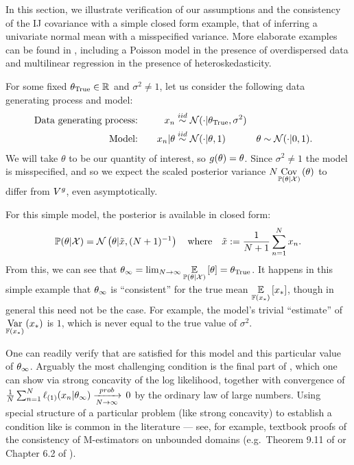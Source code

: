 \def\thetagen{\theta_{\mathrm{True}}}
\def\xbar{\tilde{\x}}

In this section, we illustrate verification of our assumptions and the
consistency of the IJ covariance with a simple closed form example, that of
inferring a univariate normal mean with a misspecified variance. More elaborate
examples can be found in , including a Poisson
model in the presence of overdispersed data and multilinear regression in the
presence of heteroskedasticity.

For some fixed $\thetagen \in \rdom{}$ and $\sigma^2 \ne 1$, let us
consider the following data generating process and model:
%
\begin{align*}
%
\textrm{Data generating process:}\quad&&
x_n &\iid \normdist(\cdot | \thetagen, \sigma^2) \\
\textrm{Model:}\quad&&
x_n \vert \theta &\iid \normdist(\cdot | \theta, 1) &
\theta &\sim \normdist(\cdot | 0, 1).
%
\end{align*}
%
We will take $\theta$ to be our quantity of interest, so $g(\theta) = \theta$.
Since $\sigma^2 \ne 1$ the model is misspecified, and so we expect the scaled posterior
variance $N \underset{\mathbb{P}(\theta | {\mathcal{X}})}{\mathrm{Cov}}\left(\theta\right)$ to differ from $V^g$, even asymptotically.

For this simple model, the posterior is available in closed form:
%
\begin{align*}
    \post = \normdist\left( \theta \vert \xbar, (N + 1)^{-1} \right)
    \quad\textrm{where}\quad
    \xbar :={} \frac{1}{N+1} \sumn \x_n.
\end{align*}
%
From this, we can see that $\thetatrue = \lim_{N \rightarrow \infty}
\expect{\post}{\theta} = \thetagen$. It happens in this simple example that
$\theta_{\infty}$ is ``consistent'' for the true mean $\underset{\mathbb{F}(x_{*})}{\mathbb{E}}\left[x_{*}\right]$,
though in general this need not be the case.  For example, the model's trivial
``estimate'' of $\underset{\mathbb{F}(x_{*})}{\mathrm{Var}}\left(x_{*}\right)$ is $1$, which is never equal to the
true value of $\sigma^2$.

One can readily verify that  are satisfied for this
model and this particular value of $\theta_{\infty}$. Arguably the most challenging
condition is the final part of  , which
one can show via strong concavity of the log likelihood, together with
convergence of $\frac{1}{N} \sum_{n=1}^N \ell_{(1)}(x_n \vert \theta_{\infty}) \xrightarrow[N\rightarrow\infty]{prob}\, 0$ by
the ordinary law of large numbers.  Using special structure of a particular
problem (like strong concavity) to establish a condition like
  is common in the literature --- see,
for example, textbook proofs of the consistency of M-estimators on unbounded
domains (e.g.~Theorem 9.11 of \citet{keener:2010:theoretical} or Chapter 6.2 of
\citep{huber:2011:robust}).

